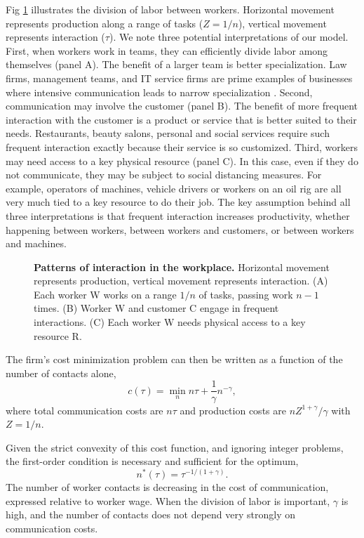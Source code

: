 \documentclass[10pt,letterpaper]{article}
\providecommand\plos[1]{}
\begin{document}
Fig \ref{fig1} illustrates the division of labor between workers. Horizontal movement represents production along a range of tasks ($Z=1/n$), vertical movement represents interaction ($\tau$). We note three potential interpretations of our model. First, when workers work in teams, they can efficiently divide labor among themselves (panel A). The benefit of a larger team is better specialization. Law firms, management teams, and IT service firms are prime examples of businesses where intensive communication leads to narrow specialization \cite{Garicano2009-jv}. Second, communication may involve the customer (panel B). The benefit of more frequent interaction with the customer is a product or service that is better suited to their needs. Restaurants, beauty salons, personal and social services require such frequent interaction exactly because their service is so customized. Third, workers may need access to a key physical resource (panel C). In this case, even if they do not communicate, they may be subject to social distancing measures. For example, operators of machines, vehicle drivers or workers on an oil rig are all very much tied to a key resource to do their job. The key assumption behind all three interpretations is that frequent interaction increases productivity, whether happening between workers, between workers and customers, or between workers and machines.

\begin{figure}[!h]
\plos{}

\caption{{\bf Patterns of interaction in the workplace.}
Horizontal movement represents production, vertical movement represents interaction. (A) Each worker W works on a range $1/n$ of tasks, passing work $n-1$ times. (B) Worker W and customer C engage in frequent interactions. (C) Each worker W needs physical access to a key resource R.}
\label{fig1}
\end{figure}

The firm's cost minimization problem can then be written as a function of the number of contacts alone,
\begin{equation}\label{TC}
	c(\tau) = \min_n n\tau + \frac 1\gamma n^{-\gamma},
\end{equation}
where total communication costs are $n\tau$ and production costs are $n Z^{1+\gamma}/\gamma$ with $Z=1/n$.

Given the strict convexity of this cost function, and ignoring integer problems, the first-order condition is necessary and sufficient for the optimum,
\begin{equation}\label{nstar}
	n^*(\tau) = \tau^{-1/(1+\gamma)}.
\end{equation}
The number of worker contacts is decreasing in the cost of communication, expressed relative to worker wage. When the division of labor is important, $\gamma$ is high, and the number of contacts does not depend very strongly on communication costs.
\end{document}
